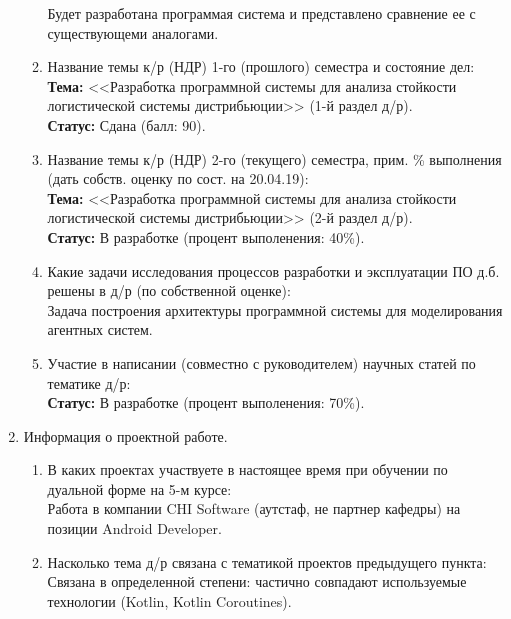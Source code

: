 \documentclass[a4paper,14pt,oneside,final]{extarticle}
\begin{document}
\begin{enumerate}
\begin{enumerate}
        Будет разработана программая система и представлено сравнение ее с существующеми аналогами.
        \item Название темы к/р (НДР) 1-го (прошлого) семестра и состояние дел: \\
        \textbf{Тема:} <<Разработка программной системы для анализа стойкости логистической системы дистрибьюции>> (1-й раздел д/р). \\
        \textbf{Статус:} Сдана (балл: 90).
        \item Название темы к/р (НДР) 2-го (текущего) семестра, прим. \% выполнения (дать собств. оценку по сост. на 20.04.19): \\
        \textbf{Тема:} <<Разработка программной системы для анализа стойкости логистической системы дистрибьюции>> (2-й раздел д/р). \\
        \textbf{Статус:} В разработке (процент выполенения: 40\%).
        \item Какие задачи исследования процессов разработки и эксплуатации ПО д.б. решены в д/р (по собственной оценке): \\
        Задача построения архитектуры программной системы для моделирования агентных систем. 
        \item Участие в написании (совместно с руководителем) научных статей по тематике д/р: \\
        \textbf{Статус:} В разработке (процент выполенения: 70\%). \\
    \end{enumerate}
    \item Информация о проектной работе.
    \begin{enumerate}
        \item В каких проектах участвуете в настоящее время при обучении по дуальной форме на 5-м курсе: \\
        Работа в компании CHI Software (аутстаф, не партнер кафедры) на позиции Android Developer.
        \item Насколько тема д/р связана с тематикой проектов предыдущего пункта: \\
        Связана в определенной степени: частично совпадают используемые технологии (Kotlin, Kotlin Coroutines). 
    \end{enumerate}
\end{enumerate}
\end{document}
